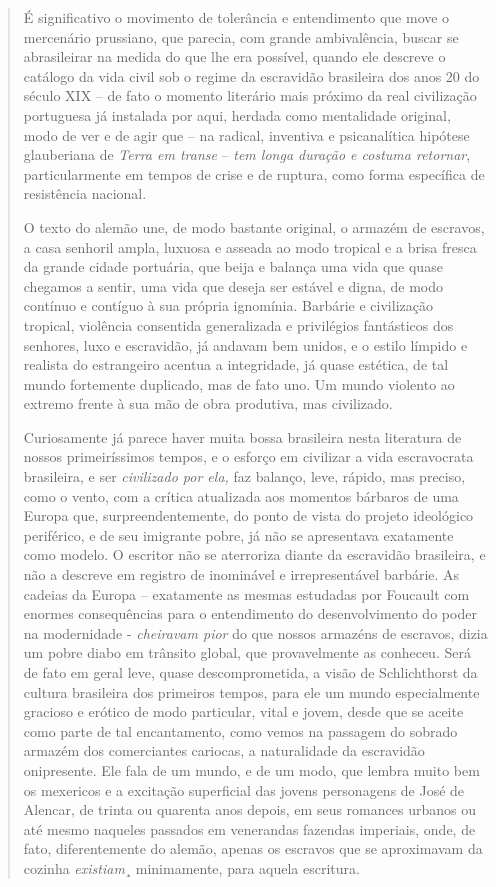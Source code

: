 \begin{quote}
É significativo o movimento de tolerância e entendimento que move o
mercenário prussiano, que parecia, com grande ambivalência, buscar se
abrasileirar na medida do que lhe era possível, quando ele descreve o
catálogo da vida civil sob o regime da escravidão brasileira dos anos 20
do século XIX -- de fato o momento literário mais próximo da real
civilização portuguesa já instalada por aqui, herdada como mentalidade
original, modo de ver e de agir que -- na radical, inventiva e
psicanalítica hipótese glauberiana de \emph{Terra em transe} --
\emph{tem longa duração e costuma retornar}, particularmente em tempos
de crise e de ruptura, como forma específica de resistência nacional.

O texto do alemão une, de modo bastante original, o armazém de escravos,
a casa senhoril ampla, luxuosa e asseada ao modo tropical e a brisa
fresca da grande cidade portuária, que beija e balança uma vida que
quase chegamos a sentir, uma vida que deseja ser estável e digna, de
modo contínuo e contíguo à sua própria ignomínia. Barbárie e civilização
tropical, violência consentida generalizada e privilégios fantásticos
dos senhores, luxo e escravidão, já andavam bem unidos, e o estilo
límpido e realista do estrangeiro acentua a integridade, já quase
estética, de tal mundo fortemente duplicado, mas de fato uno. Um mundo
violento ao extremo frente à sua mão de obra produtiva, mas civilizado.

Curiosamente já parece haver muita bossa brasileira nesta literatura de
nossos primeiríssimos tempos, e o esforço em civilizar a vida
escravocrata brasileira, e ser \emph{civilizado por ela,} faz balanço,
leve, rápido, mas preciso, como o vento, com a crítica atualizada aos
momentos bárbaros de uma Europa que, surpreendentemente, do ponto de
vista do projeto ideológico periférico, e de seu imigrante pobre, já não
se apresentava exatamente como modelo. O escritor não se aterroriza
diante da escravidão brasileira, e não a descreve em registro de
inominável e irrepresentável barbárie. As cadeias da Europa --
exatamente as mesmas estudadas por Foucault com enormes consequências
para o entendimento do desenvolvimento do poder na modernidade -
\emph{cheiravam pior} do que nossos armazéns de escravos, dizia um pobre
diabo em trânsito global, que provavelmente as conheceu. Será de fato em
geral leve, quase descomprometida, a visão de Schlichthorst da cultura
brasileira dos primeiros tempos, para ele um mundo especialmente
gracioso e erótico de modo particular, vital e jovem, desde que se
aceite como parte de tal encantamento, como vemos na passagem do sobrado
armazém dos comerciantes cariocas, a naturalidade da escravidão
onipresente. Ele fala de um mundo, e de um modo, que lembra muito bem os
mexericos e a excitação superficial das jovens personagens de José de
Alencar, de trinta ou quarenta anos depois, em seus romances urbanos ou
até mesmo naqueles passados em venerandas fazendas imperiais, onde, de
fato, diferentemente do alemão, apenas os escravos que se aproximavam da
cozinha \emph{existiam}¸ minimamente, para aquela escritura.


\end{quote}
